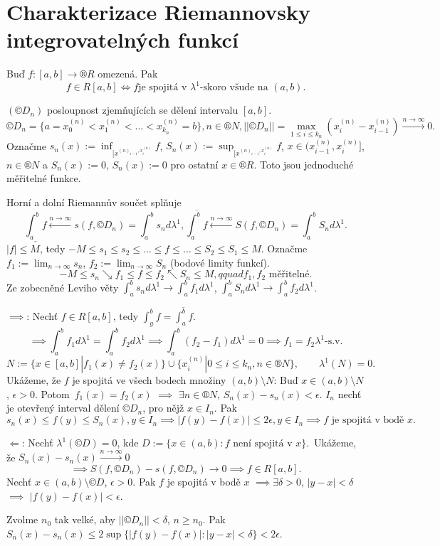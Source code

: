 \documentclass[12pt]{article}					%
\begin{document}
\section{Charakterizace Riemannovsky integrovatelných funkcí}
\begin{veta}
	Buď $f: [a, b] \rightarrow ®R$ omezená. Pak
	$$ f \in R[a, b] \Leftrightarrow f \text{je spojitá v $\lambda^1$-skoro všude na $(a, b)$}. $$

	\begin{dukazin}
		$(©D_n)$ posloupnost zjemňujících se dělení intervalu $[a, b]$.
		$$ ©D_n = \{a = x_0^{(n)} < x_1^{(n)} < … < x_{k_n}^{(n)} = b\}, n \in ®N, ||©D_n|| = \max_{1 ≤ i ≤ k_n} (x_i^{(n)} - x_{i-1}^{(n)}) \stackrel{n \rightarrow ∞}{\rightarrow} 0. $$
		Označme $s_n(x) := \inf_{[x^{(n)_{i-1}, x_i^{(n)}}} f$, $S_n(x) := \sup_{[x^{(n)_{i-1}, x_i^{(n)}}} f$, $x \in (x_{i-1}^{(n)}, x_i^{(n)}]$, $n \in ®N$ a $S_n(x) := 0$, $S_n(x):= 0$ pro ostatní $x \in ®R$. Toto jsou jednoduché měřitelné funkce.

		Horní a dolní Riemannův součet splňuje
		$$ \underline{\int_a^b f} \stackrel{n \rightarrow ∞}{\leftarrow} s(f, ©D_n) = \int_a^b s_n d\lambda^1, \overline{\int_a^b f} \stackrel{n \rightarrow ∞}{\leftarrow} S(f, ©D_n) = \int_a^b S_n d\lambda^1. $$
		$|f| ≤ M$, tedy $-M ≤ s_1 ≤ s_2 ≤ … ≤ f ≤ … ≤ S_2 ≤ S_1 ≤ M$. Označme $f_1 := \lim_{n \rightarrow ∞} s_n$, $f_2 := \lim_{n \rightarrow ∞} S_n$ (bodové limity funkcí).
		$$ -M ≤ s_n \searrow f_1 ≤ f ≤ f_2 \nwarrow S_n ≤ M, qquad f_1, f_2 \text{ měřitelné}. $$
		Ze zobecněné Leviho věty $\int_a^b s_n d\lambda^1 \rightarrow \int_a^b f_1 d\lambda^1$, $\int_a^b S_n d\lambda^1 \rightarrow \int_a^b f_2 d \lambda^1$.

		$\implies$: Nechť $f \in R[a, b]$, tedy $\underline{\int_a^b f} = \overline{\int_a^b f}$.
		$$ \implies \int_a^b f_1 d\lambda^1 = \int_a^b f_2 d \lambda^1 \implies \int_a^b (f_2 - f_1) d\lambda^1 = 0 \implies f_1 = f_2 \lambda^1\text{-s.v.} $$
		$$ N := \{x \in [a, b] | f_1(x) ≠ f_2(x)\} \cup \{x_i^{(n)} | 0 ≤ i ≤ k_n, n \in ®N\}, \qquad \lambda^1(N) = 0. $$
		Ukážeme, že $f$ je spojitá ve všech bodech množiny $(a, b) \setminus N$: Buď $x \in (a, b) \setminus N$, $\epsilon > 0$. Potom $f_1(x) = f_2(x)$ $\implies$ $\exists n \in ®N$, $S_n(x) - s_n(x) < \epsilon$. $I_n$ nechť je otevřený interval dělení $©D_n$, pro nějž $x \in I_n$. Pak
		$$ s_n(x) ≤ f(y) ≤ S_n(x), y \in I_n \implies |f(y) - f(x)| ≤ 2\epsilon, y \in I_n \implies f \text{ je spojitá v bodě $x$.} $$

		$\Leftarrow$: Nechť $\lambda^1(©D) = 0$, kde $D := \{x \in (a, b): f\text{ není spojitá v }x\}$. Ukážeme, že $S_n(x) - s_n(x) \stackrel{n \rightarrow ∞}{\rightarrow} 0$
		$$ \implies S(f, ©D_n) - s(f, ©D_n) \rightarrow 0 \implies f \in R[a, b]. $$
		Nechť $x \in (a, b) \setminus ©D$, $\epsilon > 0$. Pak $f$ je spojitá v bodě $x$ $\implies \exists \delta > 0$, $|y - x| < \delta$ $\implies$ $|f(y) - f(x)| < \epsilon$.

		Zvolme $n_0$ tak velké, aby $||©D_n|| < \delta$, $n ≥ n_0$. Pak $S_n(x) - s_n(x) ≤ 2 \sup\{|f(y) - f(x)|: |y - x| < \delta\} < 2\epsilon$.
	\end{dukazin}
\end{veta}
\end{document}
